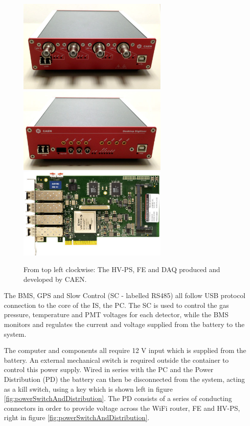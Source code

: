 \begin{figure}[htbp]
\begin{center}
\includegraphics[width=74mm]{Chapter6/figures/caenHV-PS.png}
\includegraphics[width=74mm]{Chapter6/figures/caenDigitizer.png} \\
\includegraphics[width=74mm]{Chapter6/figures/caenDAQ.png}
\caption{From top left clockwise: The HV-PS, FE and DAQ produced and developed by CAEN.}
\label{fig:caenModules}
\end{center}
\end{figure}

The BMS, GPS and Slow Control (SC - labelled RS485) all follow USB protocol connection to the core of the IS, the PC. The SC is used to control the gas pressure, temperature and PMT voltages for each detector, while the BMS monitors and regulates the current and voltage supplied from the battery to the system. 

The computer and components all require 12 V input which is supplied from the battery. An external mechanical switch is required outside the container to control this power supply. Wired in series with the PC and the Power Distribution (PD) the battery can then be disconnected from the system, acting as a kill switch, using a key which is shown left in figure \ref{fig:powerSwitchAndDistribution}. The PD consists of a series of conducting connectors in order to provide voltage across the WiFi router, FE and HV-PS, right in figure \ref{fig:powerSwitchAndDistribution}.

